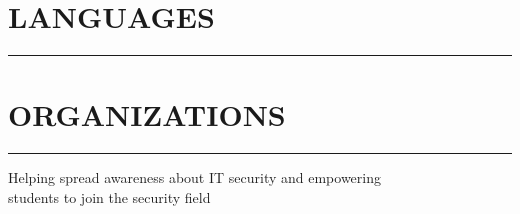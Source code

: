 \documentclass[]{resume}
\begin{document}
%
%



%
%


\begin{minipage}[t]{0.265\textwidth}

    \vspace{16.5pt}


    \section{LANGUAGES}
    \noindent\rule{5 cm}{0.4pt}


    \vspace{2pt}
    
\end{minipage}


%
%

\hfill
\begin{minipage}[t]{0.66\textwidth}

    \vspace{-55.9pt}

    \section{ORGANIZATIONS}
    \noindent\rule{12.5cm}{0.4pt}

     
    \noindent

    \vspace{8pt}
     
    \noindent

    \vspace{8pt}
     
    \noindent
    \vspace{-8pt}
    \hspace{5em}
    \begin{minipage}{0.85\textwidth\vspace{4pt}}
        Helping spread awareness about IT security and empowering\\
        students to join the security field
    \end{minipage}

\end{minipage}
\end{document}
